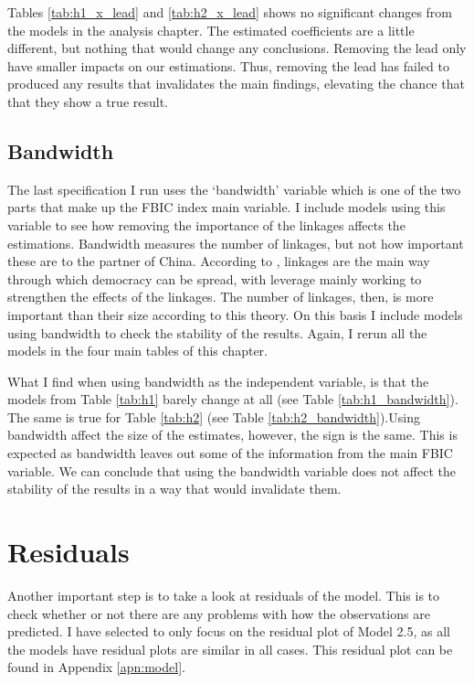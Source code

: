Tables \ref{tab:h1_x_lead} and \ref{tab:h2_x_lead} shows no significant changes from the models in the analysis chapter. The estimated coefficients are a little different, but nothing that would change any conclusions. Removing the lead only have smaller impacts on our estimations. Thus, removing the lead has failed to produced any results that invalidates the main findings, elevating the chance that that they show a true result. 

\subsection{Bandwidth}
The last specification I run uses the `bandwidth' variable which is one of the two parts that make up the FBIC index main variable. I include models using this variable to see how removing the importance of the linkages affects the estimations. Bandwidth measures the number of linkages, but not how important these are to the partner of China. According to \citet{levitsky_linkage_2006}, linkages are the main way through which democracy can be spread, with leverage mainly working to strengthen the effects of the linkages. The number of linkages, then, is more important than their size according to this theory. On this basis I include models using bandwidth to check the stability of the results. Again, I rerun all the models in the four main tables of this chapter.

What I find when using bandwidth as the independent variable, is that the models from Table \ref{tab:h1} barely change at all (see Table \ref{tab:h1_bandwidth}). The same is true for Table \ref{tab:h2} (see Table \ref{tab:h2_bandwidth}).Using bandwidth affect the size of the estimates, however, the sign is the same. This is expected as bandwidth leaves out some of the information from the main FBIC variable. We can conclude that using the bandwidth variable does not affect the stability of the results in a way that would invalidate them. 

\section{Residuals}
Another important step is to take a look at residuals of the model. This is to check whether or not there are any problems with how the observations are predicted. I have selected to only focus on the residual plot of Model 2.5, as all the models have residual plots are similar in all cases. This residual plot can be found in Appendix \ref{apn:model}.

